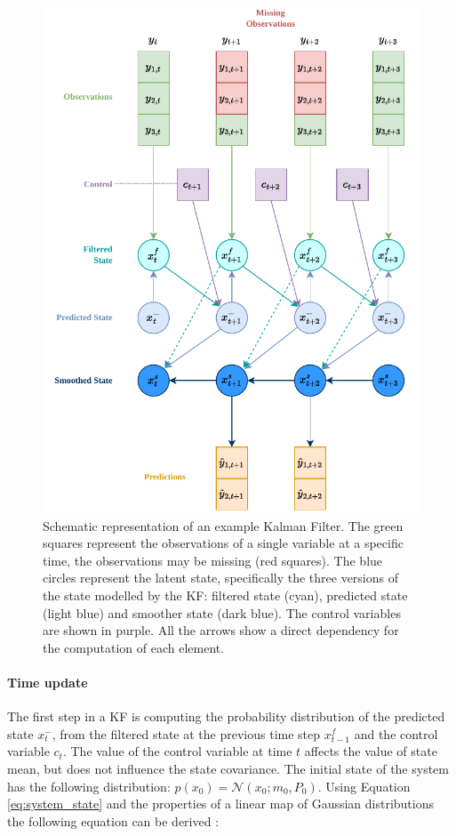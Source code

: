 \documentclass{article}
\newcommand{\norm}[3]{\mathcal{N}\left(#1; #2, #3\right)} %
\begin{document}
\begin{figure}
\centerline{\includegraphics[width=4.5in]{Kalman Filter figure}}
\caption{Schematic representation of an example Kalman Filter. The green squares represent the observations of a single variable at a specific time, the observations may be missing (red squares). The blue circles represent the latent state, specifically the three versions of the state modelled by the KF: filtered state (cyan), predicted state (light blue) and smoother state (dark blue). The control variables are shown in purple.
All the arrows show a direct dependency for the computation of each element. 
}
\label{fig:kalman_filter}
\end{figure}

\paragraph{Time update}

The first step in a KF is computing the probability distribution of the predicted state $x^-_t$, from the filtered state at the previous time step $x^f_{t-1}$ and the control variable $c_t$.
The value of the control variable at time $t$ affects the value of state mean, but does not influence the state covariance.
The initial state of the system has the following distribution: $p(x_0) = \norm{x_0}{m_0}{P_0}$. Using Equation \ref{eq:system_state} and the properties of a linear map of Gaussian distributions the following equation can be derived \cite{bishop_pattern_2006, 2020_hennig_pml}:
\end{document}
